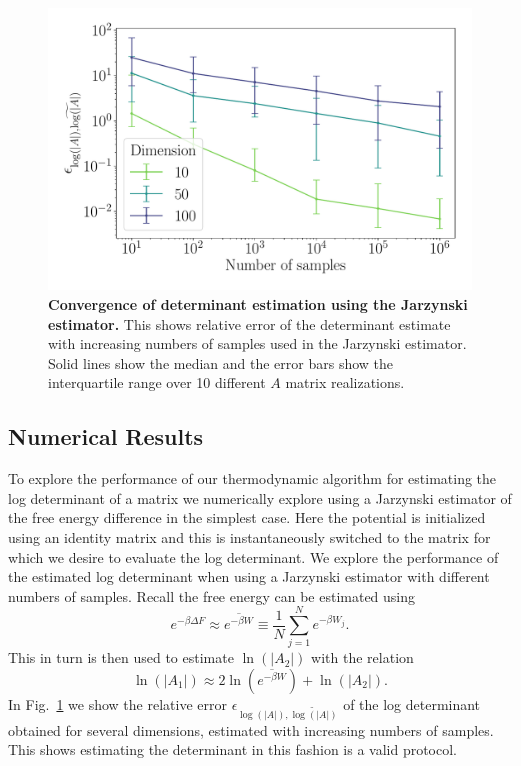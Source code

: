 \documentclass[prx,onecolumn,floatfix,longbibliography,notitlepage, nofootinbib]{revtex4-1}
\begin{document}
\begin{appendix}
\begin{figure}
    \centering
    \includegraphics[width=0.5\linewidth]{figures/rel_det_error_w_samples_F.pdf}
    \caption{\textbf{Convergence of determinant estimation using the Jarzynski estimator.} This shows relative error of the determinant estimate with increasing numbers of samples used in the Jarzynski estimator. Solid lines show the median and the error bars show the interquartile range over 10 different $A$ matrix realizations.}
    \label{fig:det}
\end{figure}


\subsection{Numerical Results}\label{app:det_numerics}

To explore the performance of our thermodynamic algorithm for estimating the log determinant of a matrix we numerically explore using a Jarzynski estimator of the free energy difference in the simplest case. Here the potential is initialized using an identity matrix and this is instantaneously switched to the matrix for which we desire to evaluate the log determinant. We explore the performance of the estimated log determinant when using a Jarzynski estimator with different numbers of samples. Recall the free energy can be estimated using
\begin{equation}
    e^{-\beta \Delta F}\approx \overline{e^{-\beta W}}  \equiv \frac{1}{N}\sum_{j=1}^N e^{-\beta W_j}.
\end{equation}
 This in turn is then used to estimate $\ln\left( \left| A_2\right|\right)$ with the relation
\begin{equation}
\ln\left(\left| A_1\right|\right) \approx 2 \ln\left(\overline{e^{-\beta W}}\right)  + \ln\left( \left| A_2\right|\right).
\end{equation}
In Fig.~\ref{fig:det} we show the relative error $\epsilon_{\log(|A|), \widetilde{\log(|A|)}}$ of the log determinant obtained for several dimensions, estimated with increasing numbers of samples. This shows estimating the determinant in this fashion is a valid protocol. 











\end{appendix}
\end{document}
